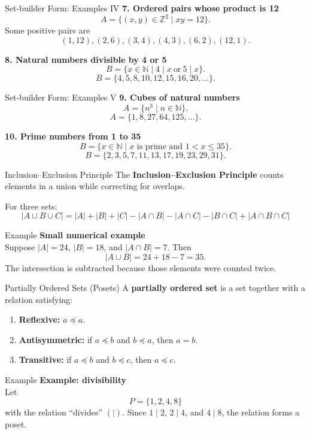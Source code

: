 \documentclass[aspectratio=169,11pt]{beamer}
\newcommand{\examplebox}[2]{
\begin{block}{Example}
\textbf{#1}\\[-1mm]
#2
\end{block}
}
\begin{document}
\begin{frame}{Set-builder Form: Examples IV}
\textbf{7. Ordered pairs whose product is 12}
\[
A=\{(x,y)\in\mathbb{Z}^2\mid xy=12\}.
\]
Some positive pairs are
\[
(1,12),(2,6),(3,4),(4,3),(6,2),(12,1).
\]

\vspace{3mm}
\textbf{8. Natural numbers divisible by 4 or 5}
\[
B=\{x\in\mathbb{N}\mid 4\mid x\ \text{or}\ 5\mid x\}.
\]
\[
B=\{4,5,8,10,12,15,16,20,\ldots\}.
\]
\end{frame}

\begin{frame}{Set-builder Form: Examples V}
\textbf{9. Cubes of natural numbers}
\[
A=\{n^3\mid n\in\mathbb{N}\}.
\]
\[
A=\{1,8,27,64,125,\ldots\}.
\]

\vspace{3mm}
\textbf{10. Prime numbers from 1 to 35}
\[
B=\{x\in\mathbb{N}\mid x\text{ is prime and }1<x\le35\}.
\]
\[
B=\{2,3,5,7,11,13,17,19,23,29,31\}.
\]
\end{frame}

\begin{frame}{Inclusion--Exclusion Principle}
The \textbf{Inclusion--Exclusion Principle} counts elements in a union while correcting for overlaps.

For three sets:
\[
\boxed{
|A\cup B\cup C|
=|A|+|B|+|C|
-|A\cap B|-|A\cap C|-|B\cap C|
+|A\cap B\cap C|
}
\]

\examplebox{Small numerical example}{
Suppose $|A|=24$, $|B|=18$, and $|A\cap B|=7$. Then
\[
|A\cup B|=24+18-7=\boxed{35}.
\]
The intersection is subtracted because those elements were counted twice.
}
\end{frame}

\begin{frame}{Partially Ordered Sets (Posets)}
A \textbf{partially ordered set} is a set together with a relation satisfying:

\begin{enumerate}
\item \textbf{Reflexive:} $a\preceq a$.
\item \textbf{Antisymmetric:} if $a\preceq b$ and $b\preceq a$, then $a=b$.
\item \textbf{Transitive:} if $a\preceq b$ and $b\preceq c$, then $a\preceq c$.
\end{enumerate}

\examplebox{Example: divisibility}{
Let
\[
P=\{1,2,4,8\}
\]
with the relation ``divides'' $(\mid)$.
Since $1\mid2$, $2\mid4$, and $4\mid8$, the relation forms a poset.
}
\end{frame}
\end{document}
